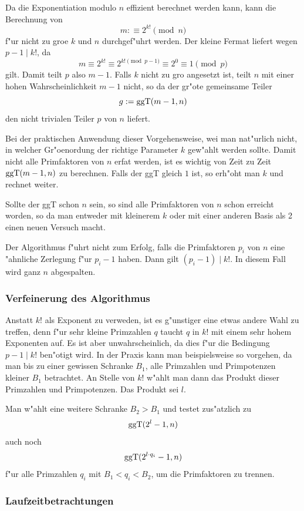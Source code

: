 Da die Exponentiation modulo $n$ effizient berechnet werden kann, kann
die Berechnung von
$$ m:\equiv 2^{k!} \pmod{n} $$ f"ur nicht zu gro\3e $k$ und $n$
durchgef"uhrt werden. Der kleine Fermat liefert wegen $p-1 \mid k!$,
da\3
$$ m \equiv 2^{k!} \equiv 2^{k! \pmod{p-1}} \equiv 2^0 \equiv 1
\pmod{p} $$ gilt. Damit teilt $p$ also $m-1$. Falls $k$ nicht zu gro\3
angesetzt ist, teilt $n$ mit einer hohen Wahrscheinlichkeit $m-1$
nicht, so da\3 der gr"o\3te gemeinsame Teiler
$$ g:=\mbox{ggT}(m-1,n) $$
den nicht trivialen Teiler $p$ von $n$ liefert.

Bei der praktischen Anwendung dieser Vorgehensweise, wei\3 man
nat"urlich nicht, in welcher Gr"o\3enordung der richtige Parameter $k$
gew"ahlt werden sollte. Damit nicht alle Primfaktoren von $n$ erfa\3t
werden, ist es wichtig von Zeit zu Zeit $\mbox{ggT}(m-1,n)$ zu
berechnen. Falls der ggT gleich $1$ ist, so erh"oht man $k$ und
rechnet weiter.

Sollte der ggT schon $n$ sein, so sind alle Primfaktoren von $n$ schon
erreicht worden, so da\3 man entweder mit kleinerem $k$ oder mit einer
anderen Basis als 2 einen neuen Versuch macht.

Der Algorithmus f"uhrt nicht zum Erfolg, falls die Primfaktoren $p_i$ 
von $n$ eine "ahnliche Zerlegung f"ur $p_i-1$ haben. Dann gilt
$(p_i-1)\mid k!$. In diesem Fall wird ganz $n$ abgespalten.

\subsubsection{Verfeinerung des Algorithmus}

Anstatt $k!$ als Exponent zu verweden, ist es g"unstiger eine etwas
andere Wahl zu treffen, denn f"ur sehr kleine Primzahlen $q$ taucht
$q$ in $k!$ mit einem sehr hohem Exponenten auf. Es ist aber
unwahrscheinlich, da\3 dies f"ur die Bedingung $p-1\mid k!$ ben"otigt
wird. In der Praxis kann man beispielsweise so vorgehen, da\3 man bis
zu einer gewissen Schranke $B_1$, alle Primzahlen und Primpotenzen
kleiner $B_1$ betrachtet. An Stelle von $k!$ w"ahlt man dann das Produkt
dieser Primzahlen und Primpotenzen. Das Produkt sei $l$.

Man w"ahlt eine weitere Schranke $B_2 > B_1$ und testet
zus"atzlich zu 
$$ \mbox{ggT}(2^l-1,n) $$
auch noch
$$ \mbox{ggT}(2^{l \cdot q_i}-1,n) $$
f"ur alle Primzahlen $q_i$ mit $B_1 < q_i < B_2$, um
die Primfaktoren zu trennen.

\subsubsection{Laufzeitbetrachtungen}

